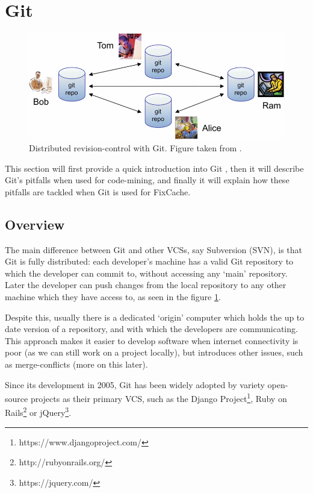 \documentclass[12pt,twoside,notitlepage]{report}
\newcommand{\fxch}{FixCache}
\begin{document}
\section{Git}\label{section-Git}
\begin{figure}[ht!]
\includegraphics[width=1.0\textwidth]{decentralised_git.png}
\caption[Distributed revision-control with Git]{Distributed revision-control with Git. Figure taken from \cite{TorvaldsGit}.}
\label{decentralised_git}
\end{figure} This section will first provide a quick introduction into Git \cite{TorvaldsGit}, then it will describe Git's pitfalls when used for code-mining, and finally it will explain how these pitfalls are tackled when Git is used for \fxch{}.
\subsection{Overview}
The main difference between Git and other VCSs, say Subversion (SVN), is that Git is fully distributed: each developer's machine has a valid Git repository to which the developer can commit to, without accessing any `main' repository. Later the developer can push changes from the local repository to any other machine which they have access to, as seen in the figure \ref{decentralised_git}.

Despite this, usually there is a dedicated `origin' computer which holds the up to date version of a repository, and with which the developers are communicating. This approach makes it easier to develop software when internet connectivity is poor (as we can still work on a project locally), but introduces other issues, such as merge-conflicts (more on this later). 

Since its development in 2005, Git has been widely adopted by variety open-source projects as their primary VCS, such as the Django Project\footnote{https://www.djangoproject.com/}, Ruby on Rails\footnote{http://rubyonrails.org/} or jQuery\footnote{https://jquery.com/}.
\end{document}
